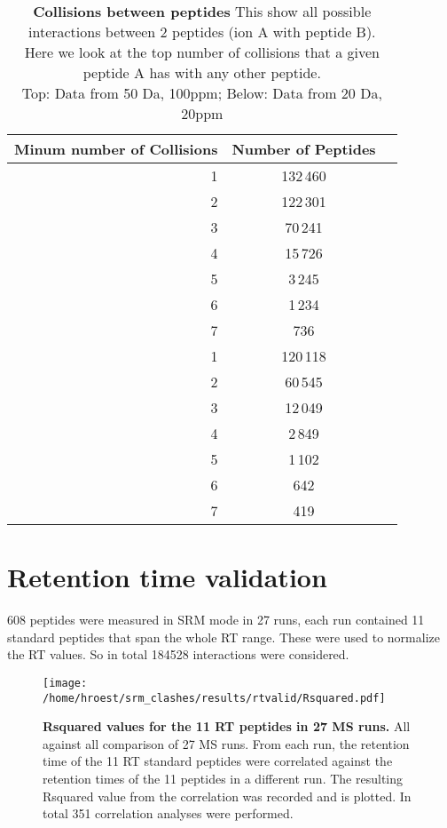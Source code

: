 \begin{table}[h]

\centering
\caption[Collisions between peptides]
{\textbf{Collisions between peptides} This show all possible interactions
between 2 peptides (ion A with peptide B). \\
Here we look at the top number of collisions that a given peptide A has with
any other peptide. \\
Top: Data from 50 Da, 100ppm; Below: Data from 20 Da, 20ppm
}
\label{tab:yeast_doublecollisions_peptide}

\begin{tabular}{ r c c }
\maketablespace
Minum number of Collisions & Number of Peptides \\
\toprule

1 & \phantom{}132\,460 \\
2 & \phantom{}122\,301 \\
3 & \phantom{}70\,241 \\
4 & \phantom{}15\,726 \\
5 & 3\,245 \\
6 & 1\,234 \\
7 & \phantom{1\,}736 \\

\midrule

1 & \phantom{}120\,118 \\
2 & \phantom{}60\,545 \\
3 & \phantom{}12\,049 \\
4 & 2\,849 \\
5 & 1\,102 \\
6 & \phantom{1\,}642 \\
7 & \phantom{1\,}419 \\


\end{tabular}
\end{table}



\clearpage
\section{Retention time validation}

608 peptides were measured in SRM mode in 27 runs, each run contained 11
standard peptides that span the whole RT range. These were used to normalize
the RT values.  So in total 184528 interactions were considered.

\begin{figure}
\texttt{[image: /home/hroest/srm\_clashes/results/rtvalid/Rsquared.pdf]}
\caption{ \textbf{Rsquared values for the 11 RT peptides in 27 MS runs.}
All against all comparison of 27 MS runs. From each run, the retention time of the 11 RT standard peptides were correlated against the retention times of the 11 peptides in a different run. The resulting Rsquared value from the correlation was recorded and is plotted. In total 351 correlation analyses were performed.  }
\label{fig:Rsquared}
\end{figure}




